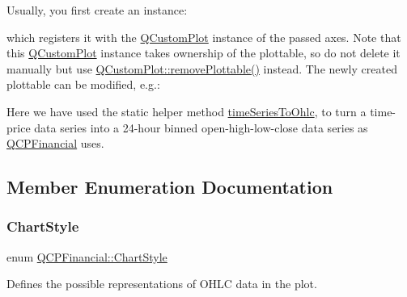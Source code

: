 Usually, you first create an instance\+:


\begin{DoxyCodeInclude}
\end{DoxyCodeInclude}
which registers it with the \hyperlink{classQCustomPlot}{Q\+Custom\+Plot} instance of the passed axes. Note that this \hyperlink{classQCustomPlot}{Q\+Custom\+Plot} instance takes ownership of the plottable, so do not delete it manually but use \hyperlink{classQCustomPlot_af3dafd56884208474f311d6226513ab2}{Q\+Custom\+Plot\+::remove\+Plottable()} instead. The newly created plottable can be modified, e.\+g.\+:


\begin{DoxyCodeInclude}
\end{DoxyCodeInclude}
Here we have used the static helper method \hyperlink{classQCPFinancial_a9a058c035040d3939b8884f4aaccb1a7}{time\+Series\+To\+Ohlc}, to turn a time-\/price data series into a 24-\/hour binned open-\/high-\/low-\/close data series as \hyperlink{classQCPFinancial}{Q\+C\+P\+Financial} uses. 

\subsection{Member Enumeration Documentation}
\mbox{\label{classQCPFinancial_a0f800e21ee98d646dfc6f8f89d10ebfb}} 
\subsubsection{\texorpdfstring{Chart\+Style}{ChartStyle}}
{\footnotesize\ttfamily enum \hyperlink{classQCPFinancial_a0f800e21ee98d646dfc6f8f89d10ebfb}{Q\+C\+P\+Financial\+::\+Chart\+Style}}

Defines the possible representations of O\+H\+LC data in the plot.

